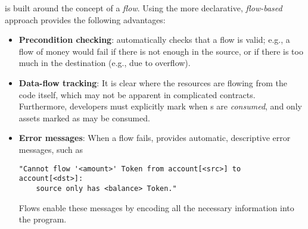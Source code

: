 \documentclass[nonacm, dvipsnames, sigconf]{acmart}
\begin{document}
\langName is built around the concept of a \emph{flow}. %
Using the more declarative, \emph{flow-based} approach provides the following advantages:
\begin{itemize}
    \item \textbf{Precondition checking}: \langName automatically checks that a flow is valid; e.g., a flow of money would fail if there is not enough in the source, or if there is too much in the destination (e.g., due to overflow).
    \item \textbf{Data-flow tracking}: It is clear where the resources are flowing from the code itself, which may not be apparent in complicated contracts. %
        Furthermore, developers must explicitly mark when \assetTxt{}s are \emph{consumed}, and only assets marked as  may be consumed.
    \item \textbf{Error messages}: When a flow fails, \langName provides automatic, descriptive error messages, such as
\begin{lstlisting}
"Cannot flow '<amount>' Token from account[<src>] to account[<dst>]:
    source only has <balance> Token."
\end{lstlisting}
        Flows enable these messages by encoding all the necessary information into the program.%
\end{itemize}
\end{document}
